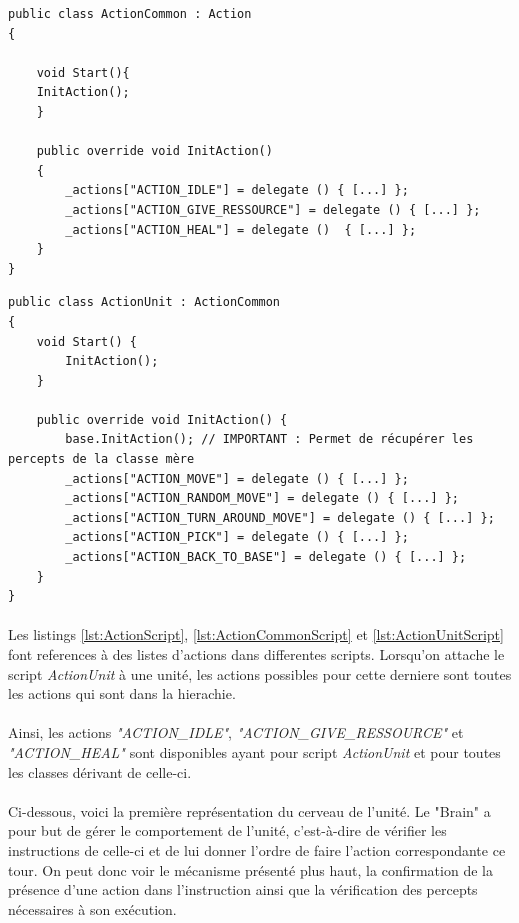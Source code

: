 \documentclass{report}
\begin{document}
\begin{lstlisting}[language={[Sharp]C},label={lst:ActionCommonScript}, caption=  Code du script ActionCommon.cs dérivant de la classe Action.cs]
public class ActionCommon : Action
{

    void Start(){      
    InitAction();
    }

    public override void InitAction()
    {
        _actions["ACTION_IDLE"] = delegate () { [...] };
        _actions["ACTION_GIVE_RESSOURCE"] = delegate () { [...] };
        _actions["ACTION_HEAL"] = delegate ()  { [...] };
    }
}
\end{lstlisting}

\begin{lstlisting}[language={[Sharp]C},label={lst:ActionUnitScript}, caption=  Code du script ActionUnit.cs dérivant de la classe ActionCommon.cs]
public class ActionUnit : ActionCommon
{
    void Start() {
        InitAction();
    }

    public override void InitAction() {
        base.InitAction(); // IMPORTANT : Permet de récupérer les percepts de la classe mère
        _actions["ACTION_MOVE"] = delegate () { [...] };
        _actions["ACTION_RANDOM_MOVE"] = delegate () { [...] };
        _actions["ACTION_TURN_AROUND_MOVE"] = delegate () { [...] };
        _actions["ACTION_PICK"] = delegate () { [...] };
        _actions["ACTION_BACK_TO_BASE"] = delegate () { [...] };
    }
}
\end{lstlisting}

\paragraph{}
Les listings \ref{lst:ActionScript}, \ref{lst:ActionCommonScript} et \ref{lst:ActionUnitScript} font references à des listes d'actions dans differentes scripts. Lorsqu'on attache le script \textit{ActionUnit} à une unité, les actions possibles pour cette derniere sont toutes les actions qui sont dans la hierachie.
\paragraph{}
Ainsi, les actions \textit{"ACTION\_IDLE"}, \textit{"ACTION\_GIVE\_RESSOURCE"} et \textit{"ACTION\_HEAL"} sont disponibles ayant pour script \textit{ActionUnit} et pour toutes les classes dérivant de celle-ci.

\paragraph{}
Ci-dessous, voici la première représentation du cerveau de l'unité. Le "Brain" a pour but de gérer le comportement de l'unité, c'est-à-dire de vérifier les instructions de celle-ci et de lui donner l'ordre de faire l'action correspondante ce tour. On peut donc voir le mécanisme présenté plus haut, la confirmation de la présence d'une action dans l'instruction ainsi que la vérification des percepts nécessaires à son exécution.
\end{document}
